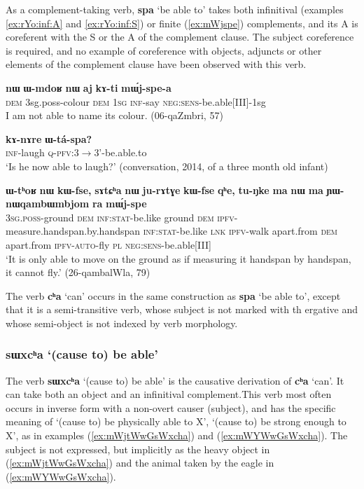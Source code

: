 \documentclass[oneside,a4paper,11pt]{article}
\newcommand{\ipa}[1]{\textbf{\phon#1}} %
\newcommand{\jpg}[2]{\ipa{#1} `#2'} %
\newcommand{\refb}[1]{(\ref{#1})}
\begin{document}
As a complement-taking verb, \jpg{spa}{be able to} takes both infinitival (examples \ref{ex:rYo:inf:A} and \ref{ex:rYo:inf:S}) or finite (\ref{ex:mWjspe}) complements, and its A is coreferent with the S or the A of the complement clause. The subject coreference is required, and no example of coreference with objects, adjuncts or other elements of the complement clause have been observed with this verb.

\begin{exe}
\ex  \label{ex:rYo:inf:A}
\gll
\ipa{nɯ} 	\ipa{ɯ-mdoʁ} 	\ipa{nɯ} 	\ipa{aj} 	\ipa{kɤ-ti} 	\ipa{mɯ́j-spe-a} \\
\textsc{dem} 3sg.poss-colour \textsc{dem} \textsc{1sg} \textsc{inf}-say \textsc{neg:sens}-be.able[III]-1sg \\
\glt I am not able to name its colour. (06-qaZmbri, 57)
\end{exe}

\begin{exe}
\ex  \label{ex:rYo:inf:S}
\gll 
 \ipa{kɤ-nɤre} 	\ipa{ɯ-tá-spa?}\\
 \textsc{inf}-laugh \textsc{q-pfv}:3$\rightarrow$3'-be.able.to\\
 \glt `Is he now able to laugh?' (conversation, 2014, of a three month old infant)
\end{exe}


\begin{exe}
\ex \label{ex:mWjspe}
\gll \ipa{ɯ-tʰoʁ}	\ipa{nɯ}	\ipa{kɯ-fse,}	\ipa{sɤtɕʰa}	\ipa{nɯ}	\ipa{ju-rɤtɣe}	\ipa{kɯ-fse}	\ipa{qʰe,}	\ipa{tu-ŋke}	\ipa{ma}	\ipa{nɯ}	\ipa{ma}	\ipa{ɲɯ-nɯqambɯmbjom}	\ipa{ra}	\ipa{mɯ́j-spe} \\
\textsc{3sg.poss}-ground \textsc{dem} \textsc{inf:stat}-be.like ground \textsc{dem}  \textsc{ipfv}-measure.handspan.by.handspan \textsc{inf:stat}-be.like  \textsc{lnk} \textsc{ipfv}-walk apart.from \textsc{dem} apart.from \textsc{ipfv-auto}-fly \textsc{pl} \textsc{neg:sens}-be.able[III] \\
\glt  `It is only able to move on the ground as if measuring it handspan by handspan, it cannot fly.' (26-qambalWla, 79)
\end{exe}
 
The verb \jpg{cʰa}{can} occurs in the same construction as \jpg{spa}{be able to}, except that it is a semi-transitive verb, whose subject is not marked with th ergative and whose semi-object is not indexed by verb morphology.


  \subsubsection{\jpg{sɯxcʰa}{(cause to) be able}} \label{sec:sWxcha}
The verb \jpg{sɯxcʰa}{(cause to) be able}  is the causative derivation of \jpg{cʰa}{can}.  It can take both an object and an infinitival complement.This verb most often occurs in inverse form with a non-overt causer (subject), and has the specific meaning of  `(cause to) be physically able to X', `(cause to) be strong enough to X', as in examples (\ref{ex:mWjtWwGsWxcha}) and (\ref{ex:mWYWwGsWxcha}). The subject is not expressed, but implicitly as the heavy object in \refb{ex:mWjtWwGsWxcha} and the animal taken by the eagle in \refb{ex:mWYWwGsWxcha}.
\end{document}

